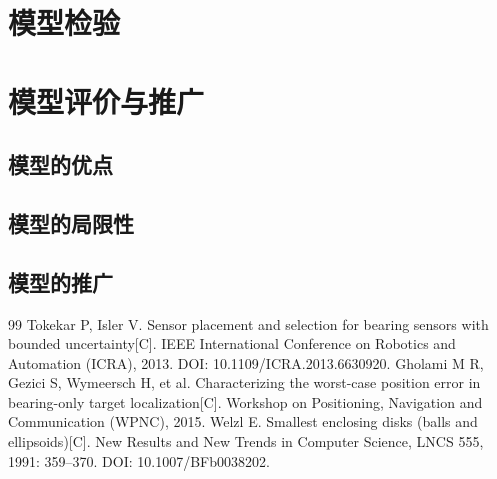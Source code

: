 \documentclass[UTF8,a4paper,zihao=-4,fontset=none]{ctexart}
\begin{document}
\section{模型检验}


\section{模型评价与推广}

\subsection{模型的优点}


\subsection{模型的局限性}


\subsection{模型的推广}


\begin{thebibliography}{99}
   Tokekar P, Isler V. Sensor placement and selection for bearing sensors with bounded uncertainty[C]. IEEE International Conference on Robotics and Automation (ICRA), 2013. DOI: 10.1109/ICRA.2013.6630920.
   Gholami M R, Gezici S, Wymeersch H, et al. Characterizing the worst-case position error in bearing-only target localization[C]. Workshop on Positioning, Navigation and Communication (WPNC), 2015.
   Welzl E. Smallest enclosing disks (balls and ellipsoids)[C]. New Results and New Trends in Computer Science, LNCS 555, 1991: 359--370. DOI: 10.1007/BFb0038202.
\end{thebibliography}
\end{document}
